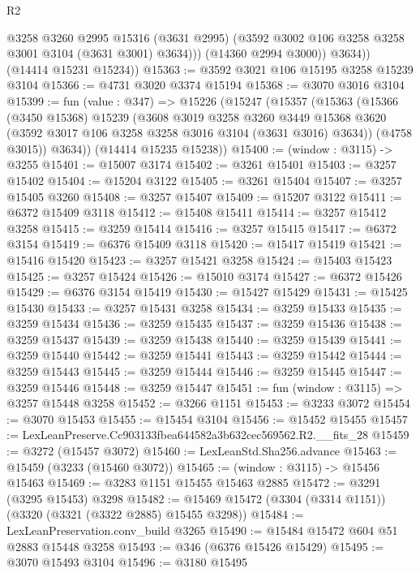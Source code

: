 \begin{lexlean}{R2}
\begin{coremodule}
                @3258
                @3260
                @2995
                @15316
                (@3631 @2995)
                (@3592 @3002 @106 @3258 @3258 @3001 @3104 (@3631 @3001) @3634)))
            (@14360 @2994 @3000))
          @3634))
      (@14414 @15231 @15234))
@15363 := @3592 @3021 @106 @15195 @3258 @15239 @3104
@15366 := @4731 @3020 @3374 @15194
@15368 := @3070 @3016 @3104
@15399 := fun (value : @347) =>
  @15226
    (@15247
      (@15357
        (@15363
          (@15366
            (@3450 @15368)
            @15239
            (@3608
              @3019
              @3258
              @3260
              @3449
              @15368
              @3620
              (@3592 @3017 @106 @3258 @3258 @3016 @3104 (@3631 @3016) @3634))
            (@4758 @3015))
          @3634))
      (@14414 @15235 @15238))
@15400 := (window : @3115) -> @3255
@15401 := @15007 @3174
@15402 := @3261 @15401
@15403 := @3257 @15402
@15404 := @15204 @3122
@15405 := @3261 @15404
@15407 := @3257 @15405 @3260
@15408 := @3257 @15407
@15409 := @15207 @3122
@15411 := @6372 @15409 @3118
@15412 := @15408 @15411
@15414 := @3257 @15412 @3258
@15415 := @3259 @15414
@15416 := @3257 @15415
@15417 := @6372 @3154
@15419 := @6376 @15409 @3118
@15420 := @15417 @15419
@15421 := @15416 @15420
@15423 := @3257 @15421 @3258
@15424 := @15403 @15423
@15425 := @3257 @15424
@15426 := @15010 @3174
@15427 := @6372 @15426
@15429 := @6376 @3154 @15419
@15430 := @15427 @15429
@15431 := @15425 @15430
@15433 := @3257 @15431 @3258
@15434 := @3259 @15433
@15435 := @3259 @15434
@15436 := @3259 @15435
@15437 := @3259 @15436
@15438 := @3259 @15437
@15439 := @3259 @15438
@15440 := @3259 @15439
@15441 := @3259 @15440
@15442 := @3259 @15441
@15443 := @3259 @15442
@15444 := @3259 @15443
@15445 := @3259 @15444
@15446 := @3259 @15445
@15447 := @3259 @15446
@15448 := @3259 @15447
@15451 := fun (window : @3115) => @3257 @15448 @3258
@15452 := @3266 @1151
@15453 := @3233 @3072
@15454 := @3070 @15453
@15455 := @15454 @3104
@15456 := @15452 @15455
@15457 := LexLeanPreserve.Cc903133fbea644582a3b632cec569562.R2.__fits_28
@15459 := @3272 (@15457 @3072)
@15460 := LexLeanStd.Sha256.advance
@15463 := @15459 (@3233 (@15460 @3072))
@15465 := (window : @3115) -> @15456 @15463
@15469 := @3283 @1151 @15455 @15463 @2885
@15472 := @3291 (@3295 @15453) @3298
@15482 := @15469 @15472 (@3304 (@3314 @1151)) (@3320 (@3321 (@3322 @2885) @15455 @3298))
@15484 := LexLeanPreservation.conv_build @3265
@15490 := @15484 @15472 @604 @51 @2883 @15448 @3258
@15493 := @346 (@6376 @15426 @15429)
@15495 := @3070 @15493 @3104
@15496 := @3180 @15495

\end{coremodule}
\end{lexlean}

